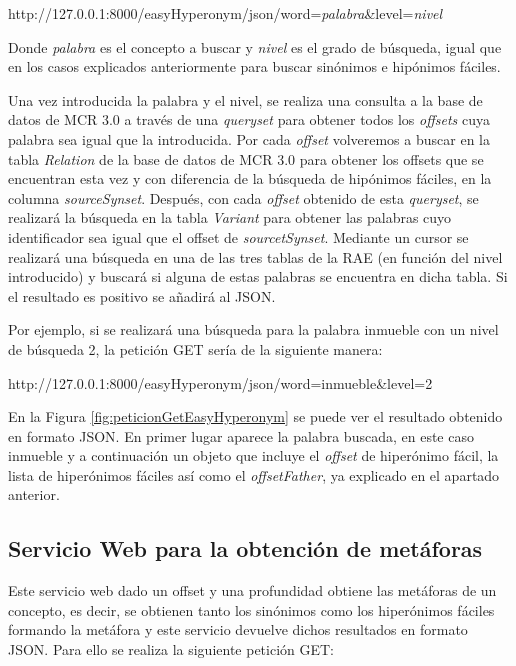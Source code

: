 http://127.0.0.1:8000/easyHyperonym/json/word=\textit{palabra}\&level=\textit{nivel}

Donde \textit{palabra} es el concepto a buscar y \textit{nivel} es el grado de búsqueda, igual que en los casos explicados anteriormente para buscar sinónimos e hipónimos fáciles.

Una vez introducida la palabra y el nivel, se realiza una consulta a la base de datos de MCR 3.0 a través de una \textit{queryset} para obtener todos los \textit{offsets} cuya palabra sea igual que la introducida.
Por cada \textit{offset} volveremos a buscar en la tabla \textit{Relation} de la base de datos de MCR 3.0 para obtener los offsets que se encuentran esta vez y con diferencia de la búsqueda de hipónimos fáciles, en la columna \textit{sourceSynset}. Después, con cada \textit{offset} obtenido de esta \textit{queryset}, se realizará la búsqueda en la tabla \textit{Variant} para obtener las palabras cuyo identificador sea igual que el offset de \textit{sourcetSynset}.
Mediante un cursor se realizará una búsqueda en una de las tres tablas de la RAE (en función del nivel introducido) y buscará si alguna de estas palabras se encuentra en dicha tabla.
Si el resultado es positivo se añadirá al JSON.

Por ejemplo, si se realizará una búsqueda para la palabra inmueble con un nivel de búsqueda 2, la petición GET sería de la siguiente manera:

http://127.0.0.1:8000/easyHyperonym/json/word=inmueble\&level=2

En la Figura \ref{fig:peticionGetEasyHyperonym} se puede ver el resultado obtenido en formato JSON. En primer lugar aparece la palabra buscada, en este caso inmueble y a continuación un objeto que incluye el \textit{offset} de hiperónimo fácil, la lista de hiperónimos fáciles así como el \textit{offsetFather}, ya explicado en el apartado anterior.


\subsection{Servicio Web  para la obtención de metáforas}
\label{cap:subsec:sw_metaforas}
Este servicio web dado un offset y una profundidad obtiene las metáforas de un concepto, es decir, se obtienen tanto los sinónimos como los hiperónimos fáciles formando la metáfora y este servicio devuelve dichos resultados en formato JSON.
Para ello se realiza la siguiente petición GET:

